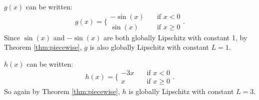 \documentclass{homework}
\begin{document}
\begin{letterenum}
\item $g(x)$ can be written:
\begin{equation*}
    g(x) = \biggl\{
        \begin{array}{ll}
            -\sin(x)  &\quad \text{if } x < 0 \\
            \sin(x) &\quad \text{if } x \geq 0
        \end{array}
    \biggr.
\end{equation*}
Since $\sin(x)$ and $-\sin(x)$ are both globally Lipschitz with constant 1,
by Theorem \ref{thm:piecewise}, $g$ is also globally Lipschitz with constant $L=1$.

\item $h(x)$ can be written:
\begin{equation*}
    h(x) = \biggl\{
        \begin{array}{ll}
            -3x  &\quad \text{if } x < 0 \\
            x &\quad \text{if } x \geq 0
        \end{array}
    \biggr.
\end{equation*}
So again by Theorem \ref{thm:piecewise}, $h$ is globally Lipschitz with constant
$L=3$.

\end{letterenum}


\end{document}
